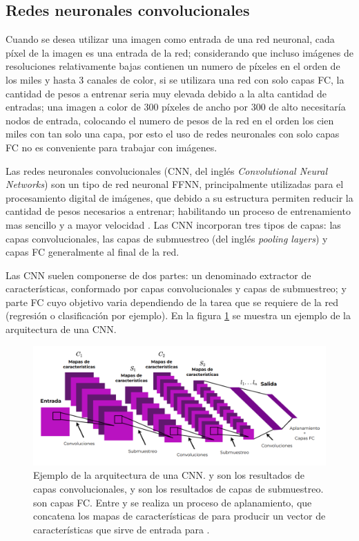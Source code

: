 \subsection{Redes neuronales convolucionales}

Cuando se desea utilizar una imagen como entrada de una red neuronal, cada píxel de la imagen es una entrada de la red; considerando que incluso imágenes de resoluciones relativamente bajas contienen un numero de píxeles en el orden de los miles y hasta 3 canales de color, si se utilizara una red con solo capas FC, la cantidad de pesos a entrenar seria muy elevada debido a la alta cantidad de entradas; una imagen a color de 300 píxeles de ancho por 300 de alto necesitaría  nodos de entrada, colocando el numero de pesos de la red en el orden los cien miles con tan solo una capa, por esto el uso de redes neuronales con solo capas FC no es conveniente para trabajar con imágenes.

Las redes neuronales convolucionales (CNN, del inglés \textit{Convolutional Neural Networks}) son un tipo de red neuronal FFNN, principalmente utilizadas para el procesamiento digital de imágenes, que debido a su estructura permiten reducir la cantidad de pesos necesarios a entrenar; habilitando un proceso de entrenamiento mas sencillo y a mayor velocidad \cite{Lecun2010}. Las CNN incorporan tres tipos de capas: las capas convolucionales, las capas de submuestreo (del inglés \textit{pooling layers}) y capas FC generalmente al final de la red.

Las CNN suelen componerse de dos partes: un denominado extractor de características, conformado por capas convolucionales y capas de submuestreo; y parte FC cuyo objetivo varia dependiendo de la tarea que se requiere de la red (regresión o clasificación por ejemplo). En la figura \ref{fig:cnn-sample} se muestra un ejemplo de la arquitectura de una CNN.

\begin{figure}[H]
    \centering
    \includegraphics[scale=0.35]{partes/img/CNN-sample.png}
    \caption[Ejemplo de la arquitectura de una CNN.]{
        Ejemplo de la arquitectura de una CNN\footnotemark.  y  son los resultados de capas convolucionales,  y  son los resultados de capas de submuestreo.  son  capas FC. Entre  y  se realiza un proceso de aplanamiento, que concatena los mapas de características de  para producir un vector de características que sirve de entrada para .
    } 
    \label{fig:cnn-sample}
\end{figure}

